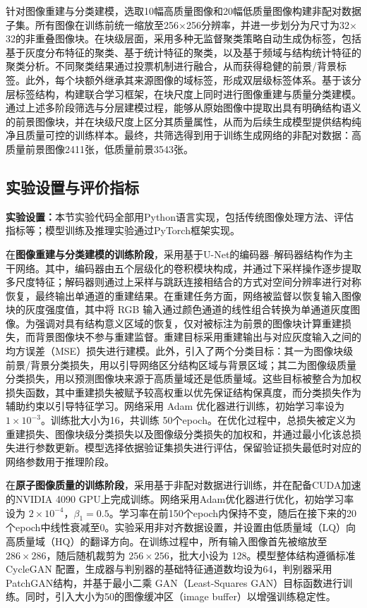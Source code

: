 针对图像重建与分类建模，选取10幅高质量图像和20幅低质量图像构建非配对数据子集。所有图像在训练前统一缩放至256$\times$256分辨率，并进一步划分为尺寸为32$\times$32的非重叠图像块。在块级层面，采用多种无监督聚类策略自动生成伪标签，包括基于灰度分布特征的聚类、基于统计特征的聚类，以及基于频域与结构统计特征的聚类分析。不同聚类结果通过投票机制进行融合，从而获得稳健的前景/背景标签。此外，每个块额外继承其来源图像的域标签，形成双层级标签体系。基于该分层标签结构，构建联合学习框架，在块尺度上同时进行图像重建与质量分类建模。通过上述多阶段筛选与分层建模过程，能够从原始图像中提取出具有明确结构语义的前景图像块，并在块级尺度上区分其质量属性，从而为后续生成模型提供结构纯净且质量可控的训练样本。最终，共筛选得到用于训练生成网络的非配对数据：高质量前景图像2411张，低质量前景3543张。

\subsection{实验设置与评价指标}
\textbf{实验设置：}本节实验代码全部用Python语言实现，包括传统图像处理方法、评估指标等；模型训练及推理实验通过PyTorch框架实现。

在\textbf{图像重建与分类建模的训练阶段}，采用基于U-Net的编码器–解码器结构作为主干网络。其中，编码器由五个层级化的卷积模块构成，并通过下采样操作逐步提取多尺度特征；解码器则通过上采样与跳跃连接相结合的方式对空间分辨率进行对称恢复，最终输出单通道的重建结果。在重建任务方面，网络被监督以恢复输入图像块的灰度强度值，其中将 RGB 输入通过颜色通道的线性组合转换为单通道灰度图像。为强调对具有结构意义区域的恢复，仅对被标注为前景的图像块计算重建损失，而背景图像块不参与重建监督。重建目标采用重建输出与对应灰度输入之间的均方误差（MSE）损失进行建模。此外，引入了两个分类目标：其一为图像块级前景/背景分类损失，用以引导网络区分结构区域与背景区域；其二为图像级质量分类损失，用以预测图像块来源于高质量域还是低质量域。这些目标被整合为加权损失函数，其中重建损失被赋予较高权重以优先保证结构保真度，而分类损失作为辅助约束以引导特征学习。网络采用 Adam 优化器进行训练，初始学习率设为 $1\times10^{-3}$。训练批大小为16，共训练 50个epoch。在优化过程中，总损失被定义为重建损失、图像块级分类损失以及图像级分类损失的加权和，并通过最小化该总损失进行参数更新。模型选择依据验证集损失进行评估，保留验证损失最低时对应的网络参数用于推理阶段。

在\textbf{原子图像质量的训练阶段}，采用基于非配对数据进行训练，并在配备CUDA加速的NVIDIA 4090 GPU上完成训练。网络采用Adam优化器进行优化，初始学习率设为 $2 \times 10^{-4}$，$\beta_1 = 0.5$。学习率在前150个epoch内保持不变，随后在接下来的20个epoch中线性衰减至0。实验采用非对齐数据设置，并设置由低质量域（LQ）向高质量域（HQ）的翻译方向。在训练过程中，所有输入图像首先被缩放至 $286 \times 286$，随后随机裁剪为 $256 \times 256$，批大小设为 128。模型整体结构遵循标准 CycleGAN 配置，生成器与判别器的基础特征通道数均设为64，判别器采用PatchGAN结构，并基于最小二乘 GAN（Least-Squares GAN）目标函数进行训练。同时，引入大小为50的图像缓冲区（image buffer）以增强训练稳定性。

